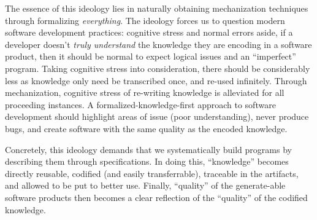 The essence of this ideology lies in naturally obtaining mechanization
techniques through formalizing \textit{everything}. The ideology forces us to
question modern software development practices: cognitive stress and normal
errors aside, if a developer doesn't \textit{truly understand} the knowledge
they are encoding in a software product, then it should be normal to expect
logical issues and an ``imperfect'' program. Taking cognitive stress into
consideration, there should be considerably less as knowledge only need be
transcribed once, and re-used infinitely. Through mechanization, cognitive
stress of re-writing knowledge is alleviated for all proceeding instances. A
formalized-knowledge-first approach to software development should highlight
areas of issue (poor understanding), never produce bugs, and create software
with the same quality as the encoded knowledge.

Concretely, this ideology demands that we systematically build programs by
describing them through specifications. In doing this, ``knowledge'' becomes
directly reusable, codified (and easily transferrable), traceable in the
artifacts, and allowed to be put to better use. Finally, ``quality'' of the
generate-able software products then becomes a clear reflection of the
``quality'' of the codified knowledge.
